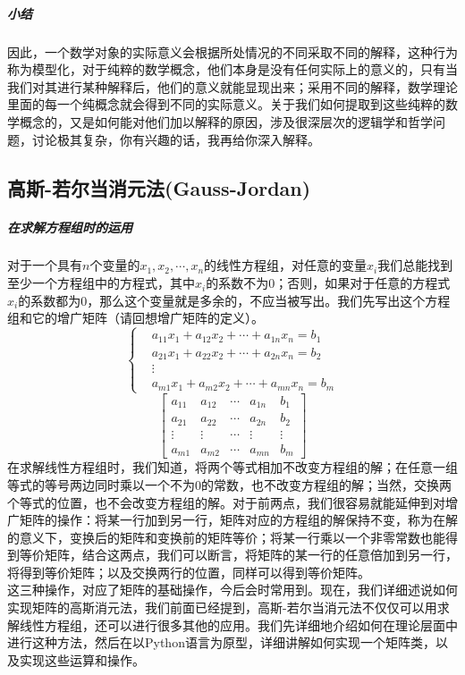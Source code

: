 \documentclass[a4paper,12pt]{ctexart}
\begin{document}
		\subparagraph{小结}
		因此，一个数学对象的实际意义会根据所处情况的不同采取不同的解释，这种行为称为模型化，对于纯粹的数学概念，他们本身是没有任何实际上的意义的，只有当我们对其进行某种解释后，他们的意义就能显现出来；采用不同的解释，数学理论里面的每一个纯概念就会得到不同的实际意义。关于我们如何提取到这些纯粹的数学概念的，又是如何能对他们加以解释的原因，涉及很深层次的逻辑学和哲学问题，讨论极其复杂，你有兴趣的话，我再给你深入解释。

\subsection{高斯-若尔当消元法(Gauss-Jordan)}
	\subparagraph{在求解方程组时的运用}
	对于一个具有$n$个变量的$x_1,x_2,\cdots,x_n$的线性方程组，对任意的变量$x_i$我们总能找到至少一个方程组中的方程式，其中$x_i$的系数不为0；否则，如果对于任意的方程式$x_i$的系数都为0，那么这个变量就是多余的，不应当被写出。我们先写出这个方程组和它的增广矩阵（请回想增广矩阵的定义）。
	$$
		\left\{
		\begin{array}{rl}
		&a_{11}x_1 + a_{12}x_2 + \cdots + a_{1n}x_n = b_1\\
		&a_{21}x_1 + a_{22}x_2 + \cdots + a_{2n}x_n = b_2\\
		&\vdots \\
		&a_{m1}x_1 + a_{m2}x_2 + \cdots + a_{mn}x_n =b_m
		\end{array}
		\right.
	$$
	$$
		\left[
		\begin{array}{ccccc}
		a_{11} & a_{12} & \cdots & a_{1n} & b_1 \\
		a_{21} & a_{22} & \cdots & a_{2n} & b_2 \\
		\vdots & \vdots & \cdots & \vdots & \vdots\\
		a_{m1} & a_{m2} & \cdots & a_{mn} & b_m
		\end{array}
		\right]
	$$
	在求解线性方程组时，我们知道，将两个等式相加不改变方程组的解；在任意一组等式的等号两边同时乘以一个不为0的常数，也不改变方程组的解；当然，交换两个等式的位置，也不会改变方程组的解。对于前两点，我们很容易就能延伸到对增广矩阵的操作：将某一行加到另一行，矩阵对应的方程组的解保持不变，称为在解的意义下，变换后的矩阵和变换前的矩阵等价；将某一行乘以一个非零常数也能得到等价矩阵，结合这两点，我们可以断言，将矩阵的某一行的任意倍加到另一行，将得到等价矩阵；以及交换两行的位置，同样可以得到等价矩阵。\\
	\indent
	这三种操作，对应了矩阵的基础操作，今后会时常用到。现在，我们详细述说如何实现矩阵的高斯消元法，我们前面已经提到，高斯-若尔当消元法不仅仅可以用求解线性方程组，还可以进行很多其他的应用。我们先详细地介绍如何在理论层面中进行这种方法，然后在以Python语言为原型，详细讲解如何实现一个矩阵类，以及实现这些运算和操作。\\
\end{document}
